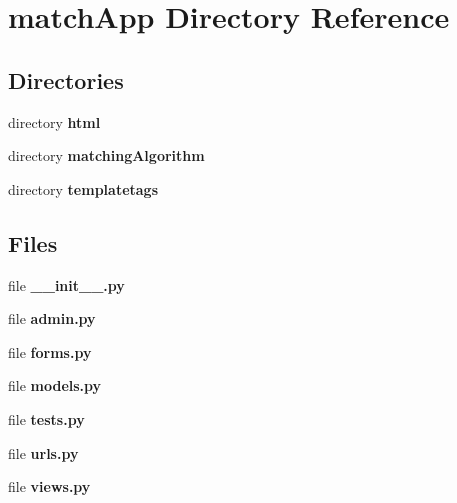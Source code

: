 \section{match\+App Directory Reference}
\label{dir_9f08404d5ea9049102ae5171ed7678aa}
\subsection*{Directories}
\begin{DoxyCompactItemize}
\item 
directory {\bf html}
\item 
directory {\bf matching\+Algorithm}
\item 
directory {\bf templatetags}
\end{DoxyCompactItemize}
\subsection*{Files}
\begin{DoxyCompactItemize}
\item 
file {\bf \+\_\+\+\_\+init\+\_\+\+\_\+.\+py}
\item 
file {\bf admin.\+py}
\item 
file {\bf forms.\+py}
\item 
file {\bf models.\+py}
\item 
file {\bf tests.\+py}
\item 
file {\bf urls.\+py}
\item 
file {\bf views.\+py}
\end{DoxyCompactItemize}
